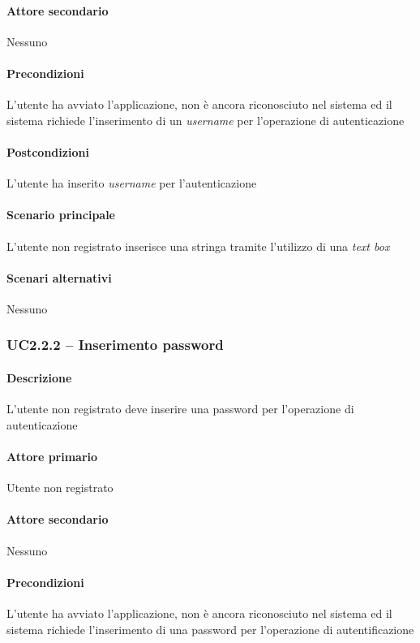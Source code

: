 \paragraph{Attore secondario}  Nessuno
\paragraph{Precondizioni}  L’utente ha avviato l’applicazione, non è ancora riconosciuto nel sistema ed il sistema richiede l’inserimento di un \textit{username} per l’operazione di autenticazione
\paragraph{Postcondizioni}  L’utente ha inserito \textit{username} per l’autenticazione
\paragraph{Scenario principale}  
L’utente non registrato inserisce una stringa tramite l’utilizzo di una \textit{text box}
\paragraph{Scenari alternativi}  Nessuno



\subsubsection{UC2.2.2 – Inserimento password}
\paragraph{Descrizione}  L’utente non registrato deve inserire una password per l’operazione di autenticazione
\paragraph{Attore primario}  Utente non registrato
\paragraph{Attore secondario}  Nessuno
\paragraph{Precondizioni}  L’utente ha avviato l’applicazione, non è ancora riconosciuto nel sistema ed il sistema richiede l’inserimento di una password per l’operazione di autentificazione
